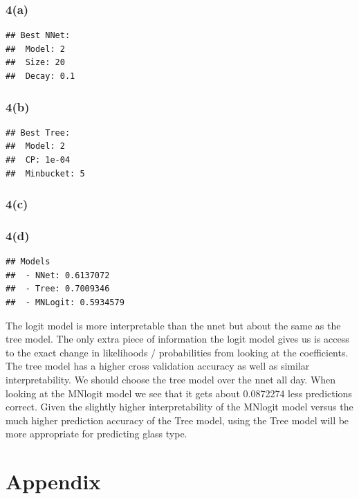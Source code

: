 \documentclass[
]{article}
\begin{document}
\hypertarget{a-3}{%
\subsubsection{4(a)}\label{a-3}}

\begin{verbatim}
## Best NNet: 
##  Model: 2 
##  Size: 20 
##  Decay: 0.1
\end{verbatim}

\hypertarget{b-3}{%
\subsubsection{4(b)}\label{b-3}}

\begin{verbatim}
## Best Tree: 
##  Model: 2 
##  CP: 1e-04 
##  Minbucket: 5
\end{verbatim}

\hypertarget{c-3}{%
\subsubsection{4(c)}\label{c-3}}

\hypertarget{d-2}{%
\subsubsection{4(d)}\label{d-2}}

\begin{verbatim}
## Models 
##  - NNet: 0.6137072 
##  - Tree: 0.7009346 
##  - MNLogit: 0.5934579
\end{verbatim}

The logit model is more interpretable than the nnet but about the same
as the tree model. The only extra piece of information the logit model
gives us is access to the exact change in likelihoods / probabilities
from looking at the coefficients. The tree model has a higher cross
validation accuracy as well as similar interpretability. We should
choose the tree model over the nnet all day. When looking at the MNlogit
model we see that it gets about 0.0872274 less predictions correct.
Given the slightly higher interpretability of the MNlogit model versus
the much higher prediction accuracy of the Tree model, using the Tree
model will be more appropriate for predicting glass type.

\hypertarget{appendix}{%
\section{Appendix}\label{appendix}}
\end{document}

